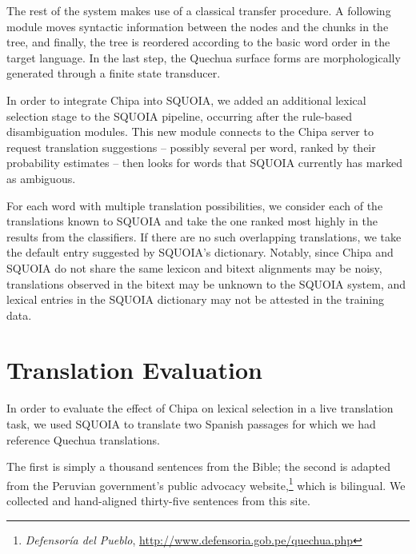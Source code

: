 The rest of the system makes use of a classical transfer procedure. A following module
moves syntactic information between the nodes and the chunks in the tree, and
finally, the tree is reordered according to the basic word order in the target
language. In the last step, the Quechua surface forms are morphologically
generated through a finite state transducer.

In order to integrate Chipa into SQUOIA, we added an additional lexical
selection stage to the SQUOIA pipeline, occurring after the rule-based
disambiguation modules. This new module connects to the Chipa server to request
translation suggestions -- possibly several per word, ranked by their
probability estimates -- then looks for words that SQUOIA currently has marked
as ambiguous.

For each word with multiple translation possibilities, we consider each of the
translations known to SQUOIA and take the one ranked most highly in the
results from the classifiers. If there are no such overlapping translations, we
take the default entry suggested by SQUOIA's dictionary.
Notably, since Chipa and SQUOIA do not share the same lexicon and bitext alignments
may be noisy, translations
observed in the bitext may be unknown to the SQUOIA system, and lexical entries in the
SQUOIA dictionary may not be attested in the training data.


\section{Translation Evaluation}
In order to evaluate the effect of Chipa on lexical selection in a live
translation task, we used SQUOIA to translate two Spanish passages for which we
had reference Quechua translations.

The first is simply a thousand sentences
from the Bible; the second is adapted from the Peruvian government's public
advocacy website,\footnote{\emph{Defensoría del Pueblo},
\url{http://www.defensoria.gob.pe/quechua.php}} which is bilingual.
We collected and hand-aligned thirty-five sentences from this site.

